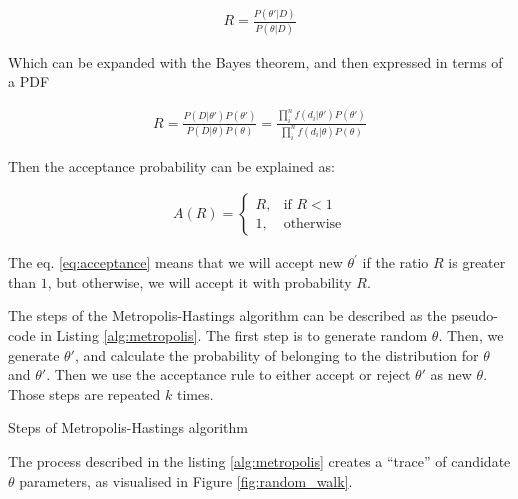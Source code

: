 \begin{align}
  R = \frac{P(\theta'|D)}{P(\theta|D)}
\end{align}

Which can be expanded with the Bayes theorem, and then expressed in terms of a PDF

\begin{align}
  R = \frac{P(D|\theta')P(\theta')}{P(D|\theta)P(\theta)} =\frac{ \prod_{i}^{n}f(d_{i}|\theta')P(\theta') }{\prod_{i}^{n}f(d_{i}|\theta)P(\theta)}
\end{align}

Then the acceptance probability can be explained as:

\begin{align}
    A(R)=
\begin{cases}
    R, & \text{if } R < 1 \\
    1,& \text{otherwise}
\end{cases}
      \label{eq:acceptance}
\end{align}

The eq. \ref{eq:acceptance} means that we will accept new $\theta^{\prime}$ if the ratio $R$ is greater than $1$, but otherwise, we will accept it with probability $R$.

The steps of the Metropolis-Hastings algorithm can be described as the pseudo-code in Listing \ref{alg:metropolis}.
The first step is to generate random $\theta$. Then, we generate $\theta\prime$, and calculate the probability of belonging to the distribution for $\theta$ and $\theta\prime$. Then we use the acceptance rule to either accept or reject $\theta\prime$ as new $\theta$. Those steps are repeated $k$ times.


\begin{algorithm}[ht]
  \caption{Steps of Metropolis-Hastings algorithm }
  \label{alg:metropolis}
\end{algorithm}


The process described in the listing \ref{alg:metropolis} creates a ``trace'' of candidate $\theta$ parameters, as visualised in Figure \ref{fig:random_walk}.

